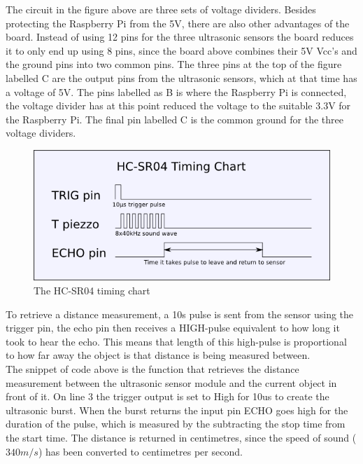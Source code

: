 The circuit in the figure above are three sets of voltage dividers. Besides protecting the Raspberry Pi from the 5V, there are also other advantages of the board. Instead of using 12 pins for the three ultrasonic sensors the board reduces it to only end up using 8 pins, since the board above combines their 5V Vcc's and the ground pins into two common pins.  
The three pins at the top of the figure labelled C are the output pins from the ultrasonic sensors, which at that time has a voltage of 5V. The pins labelled as B is where the Raspberry Pi is connected, the voltage divider has at this point reduced the voltage to the suitable 3.3V for the Raspberry Pi.  
The final pin labelled C is the common ground for the three voltage dividers.

\begin{figure}[H]
	\centering
	\includegraphics[width=.5\linewidth]{images/hcsr04timingchart.png}
	\caption{The HC-SR04 timing chart\cite{hcsr04timingchart}}
\end{figure}

To retrieve a distance measurement, a 10\mu s pulse is sent from the sensor using the trigger pin, the echo pin then receives a HIGH-pulse equivalent to how long it took to hear the echo. This means that length of this high-pulse is proportional to how far away the object is that distance is being measured between.\cite{ultrasonichowitworks}\\




The snippet of code above is the function that retrieves the distance measurement between the ultrasonic sensor module and the current object in front of it.
On line 3 the trigger output is set to High for 10us to create the ultrasonic burst. When the burst returns the input pin ECHO goes high for the duration of the pulse, which is measured by the subtracting the stop time from the start time.
The distance is returned in centimetres, since the speed of sound ($340m/s$) has been converted to centimetres per second.
